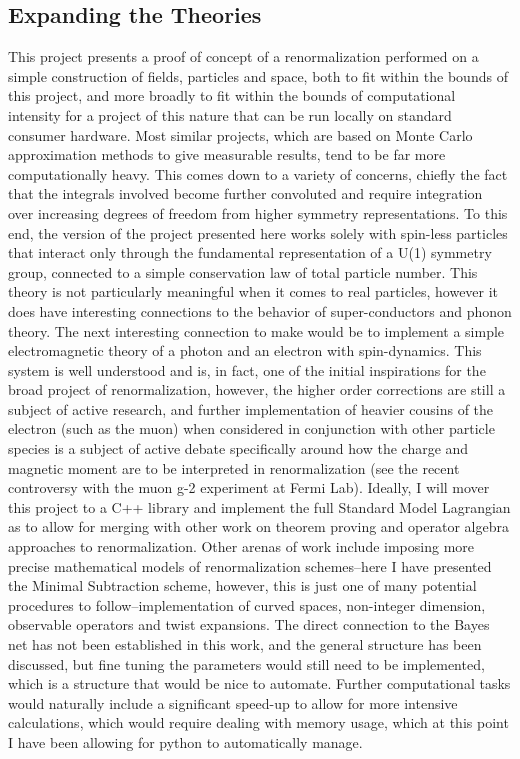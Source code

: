 \documentclass{article}
\begin{document}
\subsection{Expanding the Theories}
\hspace{0.5 cm} This project presents a proof of concept of a renormalization performed on a simple construction of fields, particles and space, both to fit within the bounds of this project, and more broadly to fit within the bounds of computational intensity for a project of this nature that can be run locally on standard consumer hardware. Most similar projects, which are based on Monte Carlo approximation methods to give measurable results, tend to be far more computationally heavy. This comes down to a variety of concerns, chiefly the fact that the integrals involved become further convoluted and require integration over increasing degrees of freedom from higher symmetry representations. To this end, the version of the project presented here works solely with spin-less particles that interact only through the fundamental representation of a U(1) symmetry group, connected to a simple conservation law of total particle number. This theory is not particularly meaningful when it comes to real particles, however it does have interesting connections to the behavior of super-conductors and phonon theory. 
The next interesting connection to make would be to implement a simple electromagnetic theory of a photon and an electron with spin-dynamics. This system is well understood and is, in fact, one of the initial inspirations for the broad project of renormalization, however, the higher order corrections are still a subject of active research, and further implementation of heavier cousins of the electron (such as the muon) when considered in conjunction with other particle species is a subject of active debate specifically around how the charge and magnetic moment are to be interpreted in renormalization (see the recent controversy with the muon g-2 experiment at Fermi Lab). 
Ideally, I will mover this project to a C++ library and implement the full Standard Model Lagrangian as to allow for merging with other work on theorem proving and operator algebra approaches to renormalization. Other arenas of work include imposing more precise mathematical models of renormalization schemes--here I have presented the Minimal Subtraction scheme, however, this is just one of many potential procedures to follow--implementation of curved spaces, non-integer dimension, observable operators and twist expansions. 
The direct connection to the Bayes net has not been established in this work, and the general structure has been discussed, but fine tuning the parameters would still need to be implemented, which is a structure that would be nice to automate. Further computational tasks would naturally include a significant speed-up to allow for more intensive calculations, which would require dealing with memory usage, which at this point I have been allowing for python to automatically manage.
\end{document}

